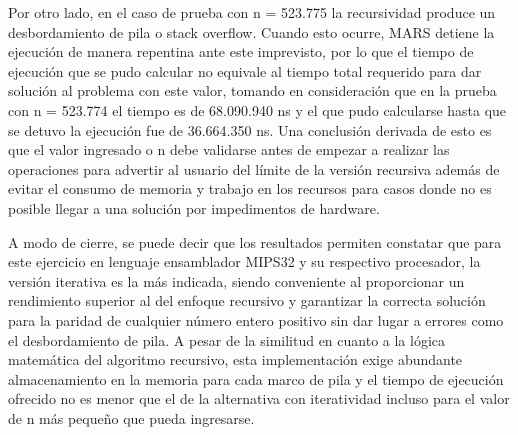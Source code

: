 \documentclass[12pt, letterpaper]{article}
\begin{document}
Por otro lado, en el caso de prueba con n = 523.775 la recursividad produce un desbordamiento de pila o stack overflow. Cuando esto ocurre, MARS detiene la ejecución de manera repentina ante este imprevisto, por lo que el tiempo de ejecución que se pudo calcular no equivale al tiempo total requerido para dar solución al problema con este valor, tomando en consideración que en la prueba con n = 523.774 el tiempo es de 68.090.940 ns y el que pudo calcularse hasta que se detuvo la ejecución fue de 36.664.350 ns. Una conclusión derivada de esto es que el valor ingresado o n debe validarse antes de empezar a realizar las operaciones para advertir al usuario del límite de la versión recursiva además de evitar el consumo de memoria y trabajo en los recursos para casos donde no es posible llegar a una solución por impedimentos de hardware. 

A modo de cierre, se puede decir que los resultados permiten constatar que para este ejercicio en lenguaje ensamblador MIPS32 y su respectivo procesador, la versión iterativa es la más indicada, siendo conveniente al proporcionar un rendimiento superior al del enfoque recursivo y garantizar la correcta solución para la paridad de cualquier número entero positivo sin dar lugar a errores como el desbordamiento de pila. A pesar de la similitud en cuanto a la lógica matemática del algoritmo recursivo, esta implementación exige abundante almacenamiento en la memoria para cada marco de pila y el tiempo de ejecución ofrecido no es menor que el de la alternativa con iteratividad incluso para el valor de n más pequeño que pueda ingresarse. 
\end{document}
